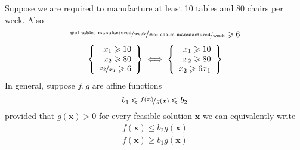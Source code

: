 \begin{exbox}
    \begin{example}
        Suppose we are required to manufacture at least 10 tables and
        80 chairs per week. Also
        \[\nicefrac{\nicefrac{\text{\#of tables manufactured}}{\text{week}}}
            {\nicefrac{\text{\#of chairs manufactured}}{\text{week}}}
            \geqslant  6\]
        \[
            \left\{\begin{array}{r}
                x_1\geqslant  10 \\
                x_2\geqslant  80 \\
                \nicefrac{x_2}{x_1}\geqslant  6
            \end{array}\right\}
            \iff
            \left\{\begin{array}{r}
                x_1\geqslant  10 \\
                x_2\geqslant  80 \\
                x_2\geqslant  6x_1
            \end{array}\right\}
        \]
        In general, suppose $f,g$ are affine functions
        \[
            b_1\leqslant \nicefrac{f(\bm{x})}{g(\bm{x})}\leqslant b_2
        \]
        provided that $g(\bm{x})>0$ for every feasible solution $\bm{x}$ we
        can equivalently write
        \begin{align*}
            f(\bm{x})\leqslant b_2 g(\bm{x}) \\
            f(\bm{x})\geqslant  b_1 g(\bm{x})
        \end{align*}
    \end{example}
\end{exbox}


